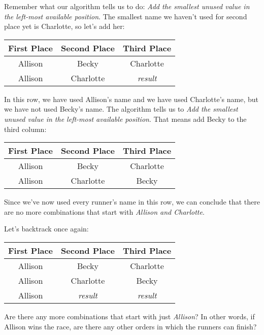 Remember what our algorithm tells us to do:  \textit{Add the smallest unused value in the left-most available position}.  The smallest name we haven't used for second place yet is Charlotte, so let's add her:

\begin{center}
    \begin{tabulary}{\textwidth}{CCC}
        First Place & Second Place & Third Place\\
        \hline
        Allison & Becky & Charlotte\\
        Allison & Charlotte & \textit{result}
    \end{tabulary}
\end{center}

In this row, we have used Allison's name and we have used Charlotte's name, but we have not used Becky's name.  The algorithm tells us to \textit{Add the smallest unused value in the left-most available position}.  That means add Becky to the third column:

\begin{center}
    \begin{tabulary}{\textwidth}{CCC}
        First Place & Second Place & Third Place\\
        \hline
        Allison & Becky & Charlotte\\
        Allison & Charlotte & Becky\\
    \end{tabulary}
\end{center}

Since we've now used every runner's name in this row, we can conclude that there are no more combinations that start with \textit{Allison and Charlotte}.

Let's backtrack once again:

\begin{center}
    \begin{tabulary}{\textwidth}{CCC}
        First Place & Second Place & Third Place\\
        \hline
        Allison & Becky & Charlotte\\
        Allison & Charlotte & Becky\\
        Allison & \textit{result} & \textit{result}
    \end{tabulary}
\end{center}

Are there any more combinations that start with just \textit{Allison}?  In other words, if Allison wins the race, are there any other orders in which the runners can finish?

